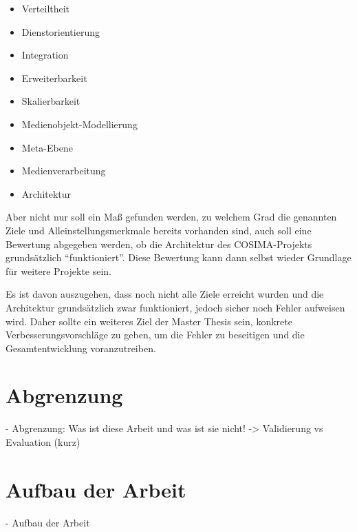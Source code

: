   \begin{itemize}
    \item Verteiltheit
    \item Dienstorientierung
    \item Integration
    \item Erweiterbarkeit
    \item Skalierbarkeit
    \item Medienobjekt-Modellierung
    \item Meta-Ebene
    \item Medienverarbeitung
    \item Architektur
  \end{itemize}
  
  Aber nicht nur soll ein Maß gefunden werden, zu welchem Grad die genannten Ziele und Alleinstellungsmerkmale bereits vorhanden sind, auch soll eine Bewertung abgegeben werden, ob die Architektur des COSIMA-Projekts grundsätzlich "`funktioniert"'. Diese Bewertung kann dann selbst wieder Grundlage für weitere Projekte sein.
  
  Es ist davon auszugehen, dass noch nicht alle Ziele erreicht wurden und die Architektur grundsätzlich zwar funktioniert, jedoch sicher noch Fehler aufweisen wird. Daher sollte ein weiteres Ziel der Master Thesis sein, konkrete Verbesserungsvorschläge zu geben, um die Fehler zu beseitigen und die Gesamtentwicklung voranzutreiben.
  


\section{Abgrenzung} %
\label{sec:abgrenzung}

  - Abgrenzung: Was ist diese Arbeit und was ist sie nicht!
    -> Validierung vs Evaluation (kurz)


\section{Aufbau der Arbeit} %
\label{sec:aufbau_der_arbeit}

- Aufbau der Arbeit


